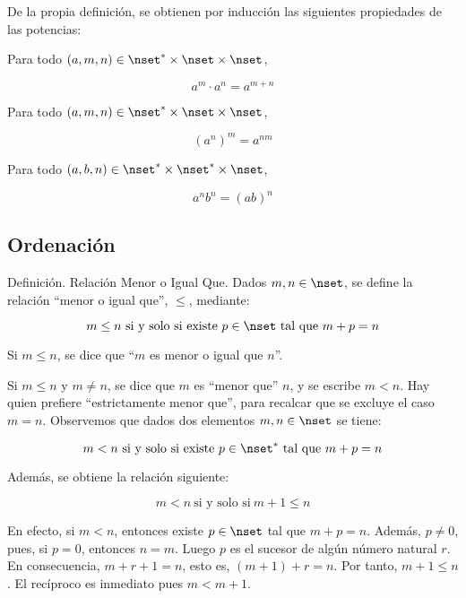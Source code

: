 De la propia definición, se obtienen por inducción las siguientes
propiedades de las potencias:

Para todo $(a, m, n) \in \nset^* \times \nset \times \nset$,

$$ a^m \cdot a^n = a^{m+n} $$

Para todo $(a, m, n) \in \nset^* \times \nset \times \nset$,

$$ (a^n)^m = a^{nm} $$

Para todo $(a, b, n) \in \nset^* \times \nset^* \times \nset$,

$$ a^n b^n = (ab)^n $$







\subsection{Ordenación}

Definición. Relación Menor o Igual Que. Dados $m, n \in \nset$, se define la
relación ``menor o igual que'', $\leq$, mediante:

$$ m \leq n \ \text{si y solo si existe} \ p \in \nset \ \text{tal que}\  m
+ p = n $$

Si $m \leq n$, se dice que ``$m$ es menor o igual que $n$''.

Si $m \leq n$ y $m \neq n$, se dice que $m$ es ``menor que'' $n$, y se
escribe $m < n$. Hay quien prefiere ``estrictamente menor que'', para
recalcar que se excluye el caso $m = n$. Observemos que dados dos elementos
$m, n \in \nset$ se tiene:

$$ m < n \ \text{si y solo si existe} \ p \in \nset^* \ \text{tal que} \ m +
p = n $$

Además, se obtiene la relación siguiente:

$$ m < n \ \text{si y solo si} \ m + 1 \leq n $$

En efecto, si $m < n$, entonces existe $p \in \nset$ tal que $m + p = n$.
Además, $p \neq 0$, pues, si $p = 0$, entonces $n = m$. Luego $p$ es el
sucesor de algún número natural $r$. En consecuencia, $m + r + 1 = n$, esto
es, $(m + 1) + r = n$. Por tanto, $m + 1 \leq n$. El recíproco es inmediato
pues $m < m + 1$.

\iffalse
Las relaciones ``mayor o igual que'', $\geq$, y ``mayor que'', o
``estrictamente mayor que'', $>$, se definen mediante:

\begin{align*}
  n \geq m, \ \text{respectivamente} \ n > m, \ \text{si y solo si} \ m \leq
    n \\
  n \geq m, \ \text{respectivamente} \ n > m, \ \text{si y solo si} \ m \leq
    n \\
\end{align*}
, \ \text{respectivamente} \ m < n $$
\fi

